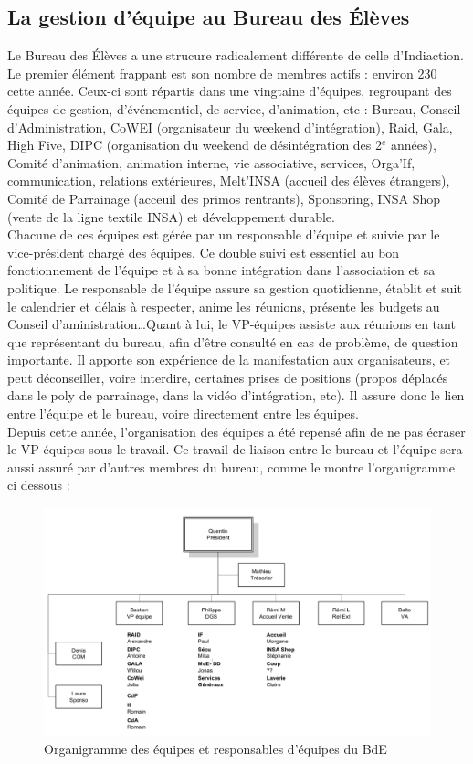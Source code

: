 \subsection{La gestion d'équipe au Bureau des Élèves}
Le Bureau des Élèves a une strucure radicalement différente de celle d'Indiaction. Le premier élément frappant est son nombre de membres actifs : environ 230 cette année. Ceux-ci sont répartis dans une vingtaine d'équipes, regroupant des équipes de gestion, d'événementiel, de service, d'animation, etc : Bureau, Conseil d'Administration, CoWEI (organisateur du weekend d'intégration), Raid, Gala, High Five, DIPC (organisation du weekend de \og désintégration \fg{} des 2$^e$ années), Comité d'animation, animation interne, vie associative, services, Orga'If, communication, relations extérieures, Melt'INSA (accueil des élèves étrangers), Comité de Parrainage (acceuil des primos rentrants), Sponsoring, INSA Shop (vente de la ligne textile INSA) et développement durable.\\

Chacune de ces équipes est gérée par un responsable d'équipe et suivie par le vice-président chargé des équipes.
Ce double suivi est essentiel au bon fonctionnement de l'équipe et à sa bonne intégration dans l'association et sa politique. Le responsable de l'équipe assure sa gestion quotidienne, établit et suit le calendrier et délais à respecter, anime les réunions, présente les budgets au Conseil d'aministration\ldots Quant à lui, le VP-équipes assiste aux réunions en tant que représentant du bureau, afin d'être consulté en cas de problème, de question importante. Il apporte son expérience de la manifestation aux organisateurs, et peut déconseiller, voire interdire, certaines prises de positions (propos déplacés dans le poly de parrainage, dans la vidéo d'intégration, etc). Il assure donc le lien entre l'équipe et le bureau, voire directement entre les équipes.\\

Depuis cette année, l'organisation des équipes a été repensé afin de ne pas écraser le VP-équipes sous le travail. Ce travail de liaison entre le bureau et l'équipe sera aussi assuré par d'autres membres du bureau, comme le montre l'organigramme ci dessous : 
\begin{figure}[h!]
	\centering
	\includegraphics[scale=0.35]{IMG/organigramme.png}
	\caption{Organigramme des équipes et responsables d'équipes du BdE}
\end{figure}

